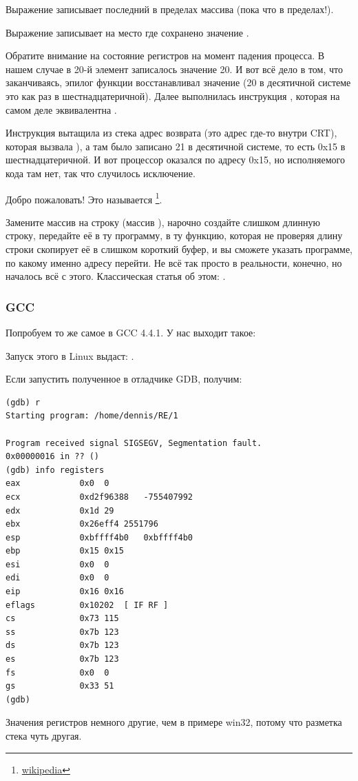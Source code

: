 Выражение  записывает последний \Tint в пределах массива (пока что в пределах!).

Выражение  записывает  на место где сохранено значение \EBP.

Обратите внимание на состояние регистров на момент падения процесса. В нашем случае 
в 20-й элемент записалось значение 20. 
И вот всё дело в том, что заканчиваясь, эпилог функции восстанавливал значение \EBP 
(20 в десятичной системе это как раз  в шестнадцатеричной). 
Далее выполнилась инструкция \RET, которая на самом деле эквивалентна .

Инструкция \RET вытащила из стека адрес возврата (это адрес где-то внутри \ac{CRT}), которая вызвала \main),
а там было записано 21 в десятичной системе, то есть 0x15 в шестнадцатеричной. 
И вот процессор оказался по адресу 0x15, но исполняемого кода там нет, так что случилось исключение.

\myindex{\BufferOverflow}
Добро пожаловать! Это называется \footnote{\href{http://go.yurichev.com/17132}{wikipedia}}.

Замените массив \Tint на строку (массив \Tchar), нарочно создайте слишком длинную строку, 
передайте её в ту программу, 
в ту функцию, которая не проверяя длину строки скопирует её в слишком короткий буфер, 
и вы сможете указать программе, по какому именно адресу перейти. 
Не всё так просто в реальности, конечно, но началось всё с этого.
Классическая статья об этом: \AlephOne.

\subsubsection{GCC}

Попробуем то же самое в GCC 4.4.1. У нас выходит такое:



Запуск этого в Linux выдаст: .

Если запустить полученное в отладчике GDB, получим:

\begin{lstlisting}
(gdb) r
Starting program: /home/dennis/RE/1 

Program received signal SIGSEGV, Segmentation fault.
0x00000016 in ?? ()
(gdb) info registers
eax            0x0	0
ecx            0xd2f96388	-755407992
edx            0x1d	29
ebx            0x26eff4	2551796
esp            0xbffff4b0	0xbffff4b0
ebp            0x15	0x15
esi            0x0	0
edi            0x0	0
eip            0x16	0x16
eflags         0x10202	[ IF RF ]
cs             0x73	115
ss             0x7b	123
ds             0x7b	123
es             0x7b	123
fs             0x0	0
gs             0x33	51
(gdb) 
\end{lstlisting}

Значения регистров немного другие, чем в примере win32, потому что разметка стека чуть другая.

